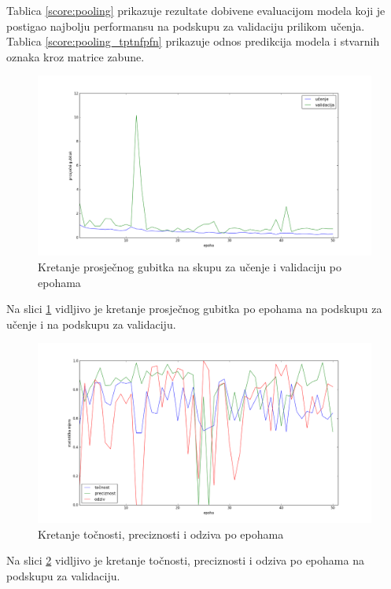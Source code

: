 \documentclass[times, utf8, diplomski, numeric]{fer}
\begin{document}
\noindent Tablica \ref{score:pooling} prikazuje rezultate dobivene evaluacijom modela koji je postigao najbolju performansu na podskupu za validaciju prilikom učenja.
Tablica \ref{score:pooling_tptnfpfn} prikazuje odnos predikcija modela i stvarnih oznaka kroz matrice zabune.

\begin{figure}[H]
\centering
\includegraphics[scale=0.35]{images/pooling_loss.png}
\caption{Kretanje prosječnog gubitka na skupu za učenje i validaciju po epohama}
\label{img:pooling_loss}
\end{figure}
\noindent Na slici \ref{img:pooling_loss} vidljivo je kretanje prosječnog gubitka po epohama na podskupu za učenje i na podskupu za validaciju.

\begin{figure}[H]
\centering
\includegraphics[scale=0.35]{images/pooling_ac_ap.png}
\caption{Kretanje točnosti, preciznosti i odziva po epohama}
\label{img:pooling_ac_ap}
\end{figure}
\noindent Na slici \ref{img:pooling_ac_ap} vidljivo je kretanje točnosti, preciznosti i odziva po epohama na podskupu za validaciju.
\end{document}
